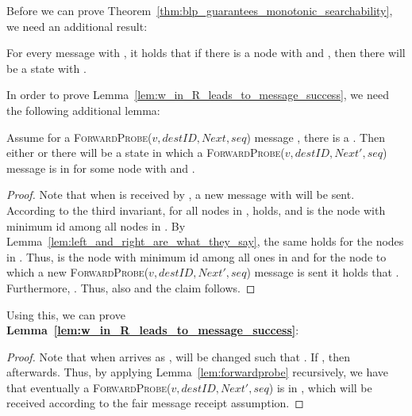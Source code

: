 \documentclass[a4paper,USenglish]{lipics}
\newcommand{\forwardprobe}[1]{\textsc{ForwardProbe(\ensuremath{#1})}\xspace}
\begin{document}
Before we can prove Theorem~\ref{thm:blp_guarantees_monotonic_searchability}, we need an additional result:
\begin{lemma}\label{lem:w_in_R_leads_to_message_success}
 For every message  with , it holds that if there is a node  with  and , then there will be a state with .
\end{lemma}
In order to prove Lemma~\ref{lem:w_in_R_leads_to_message_success}, we need the following additional lemma:
\begin{lemma}\label{lem:forwardprobe}
Assume for a \forwardprobe{v,destID, Next, seq} message , there is a .
Then either  or there will be a state in which a \forwardprobe{v,destID, Next', seq} message is  in  for some node  with  and .
\end{lemma}
\begin{proof}
	Note that when  is received by , a new message with  will be sent.
	According to the third invariant, for all nodes  in ,  holds, and  is the node with minimum id among all nodes in .
	By Lemma~\ref{lem:left_and_right_are_what_they_say}, the same holds for the nodes  in .
	Thus,  is the node with minimum id among all ones in  and for the node  to which a new \forwardprobe{v,destID,Next',seq} message is sent it holds that .
	Furthermore, .
	Thus, also  and the claim follows.
\end{proof}
Using this, we can prove \textbf{Lemma~\ref{lem:w_in_R_leads_to_message_success}}:
\begin{proof}
	Note that when  arrives as ,  will be changed such that .
	If , then  afterwards.
	Thus, by applying Lemma~\ref{lem:forwardprobe} recursively, we have that eventually  a \forwardprobe{v,destID, Next', seq} is in , which will be received according to the fair message receipt assumption.	
\end{proof}
\end{document}
